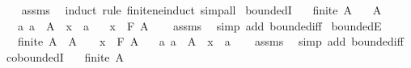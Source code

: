 \begin{isabellebody}
%
\isadelimproof
\ \ %
\endisadelimproof
%
\isatagproof
{}\isamarkupfalse%
\ assms\ \isamarkupfalse%
\ {\isacharparenleft}{\kern0pt}induct\ rule{\isacharcolon}{\kern0pt}\ finite{\isacharunderscore}{\kern0pt}ne{\isacharunderscore}{\kern0pt}induct{\isacharparenright}{\kern0pt}\ simp{\isacharunderscore}{\kern0pt}all%
\endisatagproof
{\isafoldproof}%
%
\isadelimproof
\isanewline
%
\endisadelimproof
\isanewline
{}\isamarkupfalse%
\ boundedI{\isacharcolon}{\kern0pt}\isanewline
\ \ \ {\isachardoublequoteopen}finite\ A{\isachardoublequoteclose}\isanewline
\ \ \ {\isachardoublequoteopen}A\ {\isasymnoteq}\ {\isacharbraceleft}{\kern0pt}{\isacharbraceright}{\kern0pt}{\isachardoublequoteclose}\isanewline
\ \ \ {\isachardoublequoteopen}{\isasymAnd}a{\isachardot}{\kern0pt}\ a\ {\isasymin}\ A\ {\isasymLongrightarrow}\ x\ \isactrlbold {\isasymle}\ a{\isachardoublequoteclose}\isanewline
\ \ \ {\isachardoublequoteopen}x\ \isactrlbold {\isasymle}\ F\ A{\isachardoublequoteclose}\isanewline
%
\isadelimproof
\ \ %
\endisadelimproof
%
\isatagproof
{}\isamarkupfalse%
\ assms\ \isamarkupfalse%
\ {\isacharparenleft}{\kern0pt}simp\ add{\isacharcolon}{\kern0pt}\ bounded{\isacharunderscore}{\kern0pt}iff{\isacharparenright}{\kern0pt}%
\endisatagproof
{\isafoldproof}%
%
\isadelimproof
\isanewline
%
\endisadelimproof
\isanewline
{}\isamarkupfalse%
\ boundedE{\isacharcolon}{\kern0pt}\isanewline
\ \ \ {\isachardoublequoteopen}finite\ A{\isachardoublequoteclose}\ \ {\isachardoublequoteopen}A\ {\isasymnoteq}\ {\isacharbraceleft}{\kern0pt}{\isacharbraceright}{\kern0pt}{\isachardoublequoteclose}\ \ {\isachardoublequoteopen}x\ \isactrlbold {\isasymle}\ F\ A{\isachardoublequoteclose}\isanewline
\ \ \ {\isachardoublequoteopen}{\isasymAnd}a{\isachardot}{\kern0pt}\ a\ {\isasymin}\ A\ {\isasymLongrightarrow}\ x\ \isactrlbold {\isasymle}\ a{\isachardoublequoteclose}\isanewline
%
\isadelimproof
\ \ %
\endisadelimproof
%
\isatagproof
{}\isamarkupfalse%
\ assms\ \isamarkupfalse%
\ {\isacharparenleft}{\kern0pt}simp\ add{\isacharcolon}{\kern0pt}\ bounded{\isacharunderscore}{\kern0pt}iff{\isacharparenright}{\kern0pt}%
\endisatagproof
{\isafoldproof}%
%
\isadelimproof
\isanewline
%
\endisadelimproof
\isanewline
{}\isamarkupfalse%
\ coboundedI{\isacharcolon}{\kern0pt}\isanewline
\ \ \ {\isachardoublequoteopen}finite\ A{\isachardoublequoteclose}\isanewline

\end{isabellebody}
